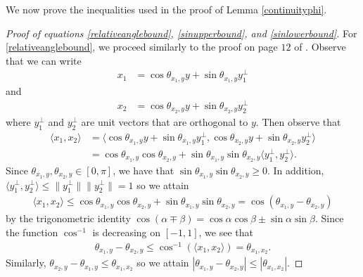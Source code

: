 \documentclass[11pt]{article}
\newcommand{\al}{\alpha}
\theoremstyle{remark}
\begin{document}
We now prove the inequalities used in the proof of Lemma \ref{continuityphi}. \begin{proof}[Proof of equations \eqref{relativeanglebound}, \eqref{sinupperbound}, and \eqref{sinlowerbound}] For \eqref{relativeanglebound}, we proceed similarly to the proof on page $12$ of \cite{Drury2001}. Observe that we can write \begin{align*}
    x_1 & = \cos \theta_{x_1,y} y + \sin \theta_{x_1,y} y_1^{\perp}
\end{align*} and \begin{align*}
    x_2 & = \cos \theta_{x_2,y} y + \sin \theta_{x_2,y} y_2^{\perp}
\end{align*} where $y_1^{\perp}$ and  $y_2^{\perp}$ are unit vectors that are orthogonal to $y$. Then observe that \begin{align*}
    \langle x_1,x_2 \rangle & = \langle \cos \theta_{x_1,y} y + \sin \theta_{x_1,y} y_1^{\perp},\cos \theta_{x_2,y} y + \sin \theta_{x_2,y} y_2^{\perp} \rangle\\
    & =  \cos \theta_{x_1,y} \cos\theta_{x_2,y} + \sin \theta_{x_1,y}\sin \theta_{x_2,y} \langle y_1^{\perp},y_2^{\perp} \rangle.
\end{align*} Since $\theta_{x_1,y},\theta_{x_2,y} \in [0,\pi]$, we have that $\sin \theta_{x_1,y}\sin\theta_{x_2,y} \geqslant 0$. In addition, $\langle y_1^{\perp},y_2^{\perp} \rangle \leqslant \|y_1^{\perp}\|\|y_2^{\perp}\| = 1$ so we attain \begin{align*}
    \langle x_1,x_2 \rangle \leqslant \cos \theta_{x_1,y} \cos\theta_{x_2,y} + \sin \theta_{x_1,y}\sin \theta_{x_2,y} = \cos(\theta_{x_1,y} - \theta_{x_2,y})
\end{align*} by the trigonometric identity $\cos(\al \mp \beta) = \cos\al\cos\beta \pm \sin\al\sin\beta.$ Since the function $\cos^{-1} $ is decreasing on $[-1,1]$, we see that \begin{align*}
    \theta_{x_1,y} - \theta_{x_2,y} \leqslant \cos^{-1}(\langle x_1,x_2 \rangle) = \theta_{x_1,x_2}.
\end{align*} Similarly, $\theta_{x_2,y} - \theta_{x_1,y} \leqslant \theta_{x_1,x_2}$ so we attain $|\theta_{x_1,y} - \theta_{x_2,y}| \leqslant |\theta_{x_1,x_2}|.$



\end{proof}
\end{document}
